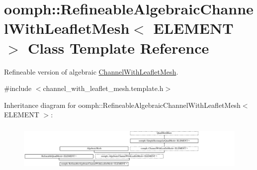 \hypertarget{classoomph_1_1RefineableAlgebraicChannelWithLeafletMesh}{}\section{oomph\+:\+:Refineable\+Algebraic\+Channel\+With\+Leaflet\+Mesh$<$ E\+L\+E\+M\+E\+NT $>$ Class Template Reference}
\label{classoomph_1_1RefineableAlgebraicChannelWithLeafletMesh}


Refineable version of algebraic \hyperlink{classoomph_1_1ChannelWithLeafletMesh}{Channel\+With\+Leaflet\+Mesh}.  




{\ttfamily \#include $<$channel\+\_\+with\+\_\+leaflet\+\_\+mesh.\+template.\+h$>$}

Inheritance diagram for oomph\+:\+:Refineable\+Algebraic\+Channel\+With\+Leaflet\+Mesh$<$ E\+L\+E\+M\+E\+NT $>$\+:\begin{figure}[H]
\begin{center}
\leavevmode
\includegraphics[height=2.333333cm]{classoomph_1_1RefineableAlgebraicChannelWithLeafletMesh}
\end{center}
\end{figure}
